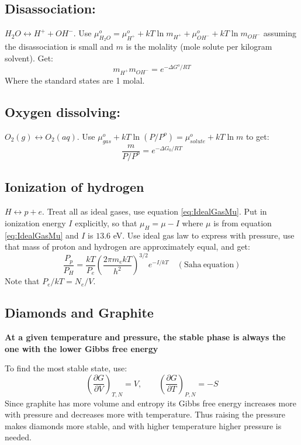 \documentclass[a4paper,norsk, 10pt]{article}
\newcommand{\pd}[3]{\left(\frac{\partial #1}{\partial #2}\right)_{#3}}
\begin{document}
\subsection{Disassociation:}
$H_2O\leftrightarrow H^++OH^-$. Use $\mu^o_{H_2O}=\mu^o_{H^+}+kT\ln m_{H^+}+\mu_{OH^-}^o + kT\ln m_{OH^-}$ assuming the disassociation is small and $m$ is the molality (mole solute per kilogram solvent). Get:
\begin{equation}
m_{H^+}m_{OH^-}=e^{-\Delta G^o/RT}
\end{equation}
Where the standard states are 1 molal.
\subsection{Oxygen dissolving:}
$O_2(g)\leftrightarrow O_2(aq)$.
Use $\mu_{gas}^o+kT\ln(P/P^o)=\mu_{solute}^o+kT\ln m$ to get:
\begin{equation}
\frac{m}{P/P^o}=e^{-\Delta G_0/RT}
\end{equation}
\subsection{Ionization of hydrogen}
$H\leftrightarrow p+e$. Treat all as ideal gases, use equation \ref{eq:IdealGasMu}. Put in ionization energy $I$ explicitly, so that $\mu_H=\mu-I$ where $\mu$ is from equation \ref{eq:IdealGasMu} and $I$ is $13.6$ eV. Use ideal gas law to express with pressure, use that mass of proton and hydrogen are approximately equal, and get:
\begin{equation}
\frac{P_p}{P_H}=\frac{kT}{P_e}\left(\frac{2\pi m_e kT}{h^2}\right)^{3/2} e^{-I/kT} \quad (\mathrm{Saha\ equation})
\end{equation}
Note that $P_e/kT=N_e/V$.

\subsection{Diamonds and Graphite}
\textbf{At a given temperature and pressure, the stable phase is always the one with the lower Gibbs free energy}

To find the most stable state, use:
\begin{equation}
\pd{G}{V}{T,N} = V, \qquad \pd{G}{T}{P,N} = -S
\end{equation}
Since graphite has more volume and entropy its Gibbs free energy increases more with pressure and decreases more with temperature. Thus raising the pressure makes diamonds more stable, and with higher temperature higher pressure is needed.
\end{document}

